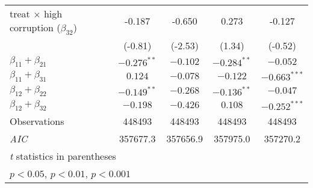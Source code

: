 {\begin{tabular}{l*{4}{c}}
treat $\times$ high corruption ($\beta_{32}$)&      -0.187         &      -0.650\sym{*}  &       0.273         &      -0.127         \\
                    &     (-0.81)         &     (-2.53)         &      (1.34)         &     (-0.52)         \\
\midrule
$\beta_{11} + \beta_{21}$& $-0.276^{**} $ & $-0.102 $ & $-0.284^{**} $ & $-0.052 $ \\
$\beta_{11} + \beta_{31}$& $0.124 $ & $-0.078 $ & $-0.122 $ & $-0.663^{***} $ \\
$\beta_{12} + \beta_{22}$& $-0.149^{**} $ & $-0.268 $ & $-0.136^{**} $ & $-0.047 $ \\
$\beta_{12} + \beta_{32}$& $-0.198 $ & $-0.426 $ & $0.108 $ & $-0.252^{***} $ \\
Observations        &      448493         &      448493         &      448493         &      448493         \\
\textit{AIC}        &    357677.3         &    357656.9         &    357975.0         &    357270.2         \\
\bottomrule
\multicolumn{5}{l}{\footnotesize \textit{t} statistics in parentheses}\\
\multicolumn{5}{l}{\footnotesize \sym{*} \(p<0.05\), \sym{**} \(p<0.01\), \sym{***} \(p<0.001\)}\\
\end{tabular}
}
